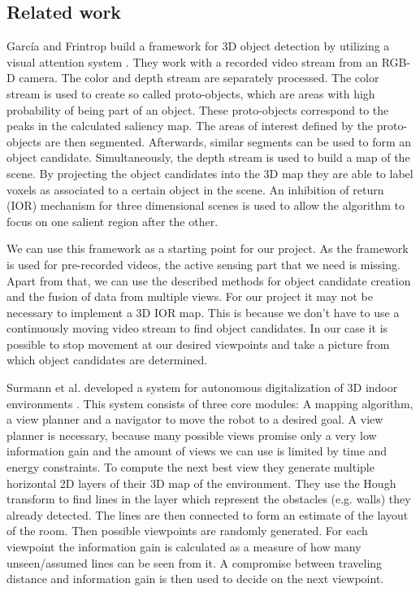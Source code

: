 \documentclass[a4paper,11pt,english]{article}
\begin{document}
\subsection{Related work}\label{relatedwork}
García and Frintrop build a framework for 3D object detection by utilizing a visual attention system \cite{garcia2013computational}.
They work with a recorded video stream from an RGB-D camera. The color and depth stream are separately processed. 
The color stream is used to create so called proto-objects, which are areas with high probability of being part of an object. These proto-objects correspond to the peaks in the calculated saliency map. 
The areas of interest defined by the proto-objects are then segmented.
Afterwards, similar segments can be used to form an object candidate.
Simultaneously, the depth stream is used to build a map of the scene.
By projecting the object candidates into the 3D map they are able to label voxels as associated to a certain object in the scene.
An inhibition of return (IOR) mechanism for three dimensional scenes is used to allow the algorithm to focus on one salient region after the other.

We can use this framework as a starting point for our project.
As the framework is used for pre-recorded videos, the active sensing part that we need is missing.
Apart from that, we can use the described methods for object candidate creation and the fusion of data from multiple views.
For our project it may not be necessary to implement a 3D IOR map. This is because we don't have to use a continuously moving video stream to find object candidates. In our case it is possible to stop movement at our desired viewpoints and take a picture from which object candidates are determined. \medskip

Surmann et al. developed a system for autonomous digitalization of 3D indoor environments \cite{surmann2003autonomous}.
This system consists of three core modules: A mapping algorithm, a view planner and a navigator to move the robot to a desired goal.
A view planner is necessary, because many possible views promise only a very low information gain and the amount of views we can use is limited by time and energy constraints.
To compute the next best view they generate multiple horizontal 2D layers of their 3D map of the environment.
They use the Hough transform to find lines in the layer which represent the obstacles (e.g. walls) they already detected.
The lines are then connected to form an estimate of the layout of the room.
Then possible viewpoints are randomly generated.
For each viewpoint the information gain is calculated as a measure of how many unseen/assumed lines can be seen from it.
A compromise between traveling distance and information gain is then used to decide on the next viewpoint.
\end{document}
